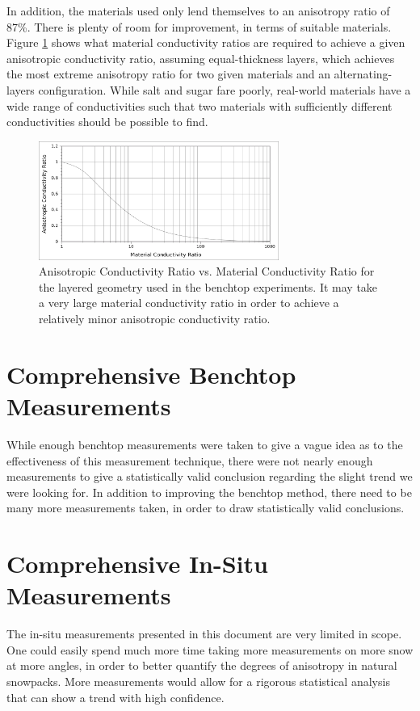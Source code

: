 In addition, the materials used only lend themselves to an anisotropy ratio of
87\%. There is plenty of room for improvement, in terms of suitable materials.
Figure \ref{fig:anisovmatl_rats} shows what material conductivity ratios are
required to achieve a given anisotropic conductivity ratio, assuming
equal-thickness layers, which achieves the most extreme anisotropy ratio for
two given materials and an alternating-layers configuration. While salt and
sugar fare poorly, real-world materials have a wide range of conductivities
such that two materials with sufficiently different conductivities should be
possible to find.

\begin{figure}[h]
\centering
\includegraphics[width=0.7\textwidth]{fig/anisovmaterial_ratios.png}
\caption{Anisotropic Conductivity Ratio vs. Material Conductivity Ratio for the
layered geometry used in the benchtop experiments. It may take a very large
material conductivity ratio in order to achieve a relatively minor anisotropic
conductivity ratio.}
\label{fig:anisovmatl_rats}
\end{figure}

\section{Comprehensive Benchtop Measurements}

While enough benchtop measurements were taken to give a vague idea as to the
effectiveness of this measurement technique, there were not nearly enough
measurements to give a statistically valid conclusion regarding the slight
trend we were looking for. In addition to improving the benchtop method, there
need to be many more measurements taken, in order to draw statistically valid
conclusions.

\section{Comprehensive In-Situ Measurements}

The in-situ measurements presented in this document are very limited in scope.
One could easily spend much more time taking more measurements on more snow at
more angles, in order to better quantify the degrees of anisotropy in natural
snowpacks. More measurements would allow for a rigorous statistical analysis that
can show a trend with high confidence.


